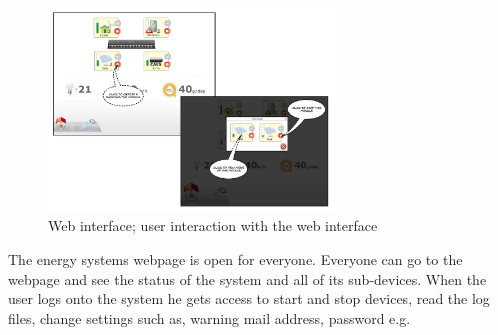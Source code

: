 		\begin{figure}[H]
			\begin{centering}
				 \includegraphics[width=0.68\textwidth]{images/web_interface2.jpg}
				\caption{Web interface; user interaction with the web interface}
		 	\end{centering}
		\end{figure}			

		The energy systems webpage is open for everyone. Everyone can go to the webpage and see the status of the system and all of its sub-devices.
		When the user logs onto the system he gets access to start and stop devices, read the log files, change settings such as, warning mail address,
		password e.g.

